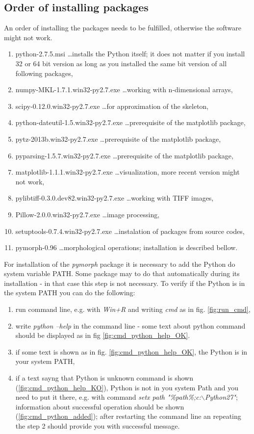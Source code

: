 \subsection{Order of installing packages}
An order of installing the packages needs to be fulfilled, otherwise the software might not work.
\begin{enumerate}
	\item python-2.7.5.msi \ldots installs the Python itself; it does not matter if you install 32 or 64 bit version as long as you installed the same bit version of all following packages,
	\item numpy-MKL-1.7.1.win32-py2.7.exe \ldots working with n-dimensional arrays,
	\item scipy-0.12.0.win32-py2.7.exe \ldots for approximation of the skeleton,
	\item python-dateutil-1.5.win32-py2.7.exe \ldots prerequisite of the matplotlib package,
	\item pytz-2013b.win32-py2.7.exe \ldots prerequisite of the matplotlib package,
	\item pyparsing-1.5.7.win32-py2.7.exe \ldots prerequisite of the matplotlib package,
	\item matplotlib-1.1.1.win32-py2.7.exe \ldots visualization, more recent version might not work,
	\item pylibtiff-0.3.0.dev82.win32-py2.7.exe \ldots working with TIFF images,
	\item Pillow-2.0.0.win32-py2.7.exe \ldots image processing,
	\item setuptools-0.7.4.win32-py2.7.exe \ldots instalation of packages from source codes,
	\item pymorph-0.96 \ldots morphological operations; installation is described bellow.
\end{enumerate}

For installation of the \textit{pymorph} package it is necessary to add the Python do system variable PATH. Some package may to do that automatically during its installation - in that case this step is not necessary. To verify if the Python is in the system PATH you can do the following:
\begin{enumerate}
	\item run command line, e.g. with \textit{Win+R} and writing \textit{cmd} as in fig. \ref{fig:run_cmd},
	\item write \textit{python --help} in the command line - some text about python command should be displayed as in fig \ref{fig:cmd_python_help_OK}.
	\item if some text is shown as in fig. \ref{fig:cmd_python_help_OK}, the Python is in your system PATH,
	\item if a text sayng that Python is unknown command is shown (\ref{fig:cmd_python_help_KO}), Python is not in you system Path and you need to put it there, e.g. with command \textit{setx path "\%path\%;c:$\backslash$Python27"}; information about successful operation should be shown (\ref{fig:cmd_python_added}); after restarting the command line an repeating the step 2 should provide you with successful message.
\end{enumerate}


